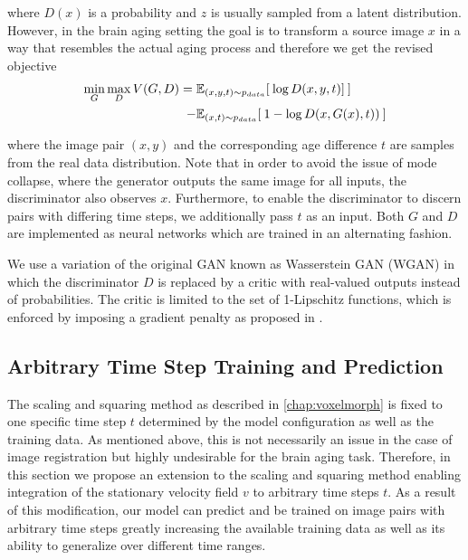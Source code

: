 where $D(x)$ is a probability and $z$ is usually sampled from a latent distribution. However, in the brain aging setting the goal is to transform a source image $x$ in a way that resembles the actual aging process and therefore we get the revised objective
\begin{equation}
	\begin{split}
		\min_G \max_D V(G, D) = \; & \mathbb{E}_{ (x, y, t) \sim p_{data} } [ \: \log{D (x, y, t)}] \: ] \\
		 - & \mathbb{E}_{ (x, t) \sim p_{data} } [ \: 1 - \log{D (x, G(x), t)}) \: ]
	\end{split}
\end{equation}

where the image pair $(x, y)$ and the corresponding age difference $t$ are samples from the real data distribution. Note that in order to avoid the issue of mode collapse, where the generator outputs the same image for all inputs, the discriminator also observes $x$. Furthermore, to enable the discriminator to discern pairs with differing time steps, we additionally pass $t$ as an input. Both $G$ and $D$ are implemented as neural networks which are trained in an alternating fashion. 

We use a variation of the original GAN known as Wasserstein GAN (WGAN) \cite{arjovsky2017wasserstein} in which the discriminator $D$ is replaced by a critic with real-valued outputs instead of probabilities. The critic is limited to the set of 1-Lipschitz functions, which is enforced by imposing a gradient penalty as proposed in \cite{gulrajani2017improved}.

\subsection{Arbitrary Time Step Training and Prediction} \label{sec:adaarbtimestep}
The scaling and squaring method as described in \autoref{chap:voxelmorph} is fixed to one specific time step $t$ determined by the model configuration as well as the training data. As mentioned above, this is not necessarily an issue in the case of image registration but highly undesirable for the brain aging task. Therefore, in this section we propose an extension to the scaling and squaring method enabling integration of the stationary velocity field $v$ to arbitrary time steps $t$. As a result of this modification, our model can predict and be trained on image pairs with arbitrary time steps greatly increasing the available training data as well as its ability to generalize over different time ranges.

